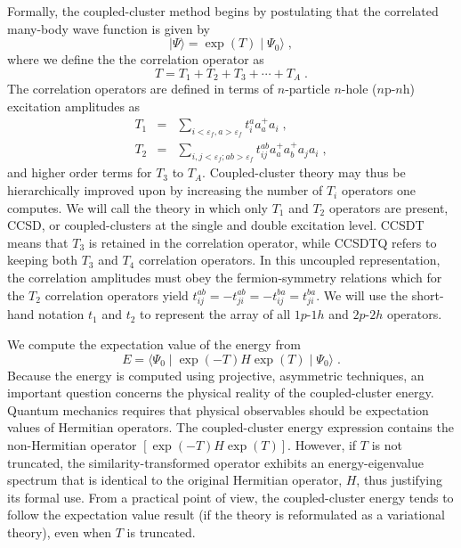 \documentclass[aps,prc,twocolumn,floatfix]{revtex4}
\begin{document}
Formally, the coupled-cluster method begins by postulating that 
the correlated many-body wave function is given by 
\begin{equation}
\mid \Psi \rangle = \exp\left(T\right)\mid \Psi_0\rangle  \;,
\end{equation}
where we define the 
the correlation operator as 
\begin{equation}
T=T_1 + T_2 + T_3 + \cdots + T_A \;. 
 \end{equation}
The correlation operators are defined in terms of 
$n$-particle $n$-hole ($n$p-$n$h) excitation amplitudes as 
\begin{eqnarray}
T_1 &=& \sum_{i<\varepsilon_f,a>\varepsilon_f} t^a_i a^+_a a_i\;, \\
T_2 &=& \sum_{i,j<\varepsilon_f; ab > \varepsilon_f}t^{ab}_{ij}
a^+_a a^+_b a_j a_i \;,
\end{eqnarray}
and higher order terms for $T_3$ to $T_A$. 
Coupled-cluster theory may thus be hierarchically  improved upon by 
increasing the number of $T_i$ operators one computes. We will call
the theory in which only $T_1$ and $T_2$ operators are present, CCSD, 
or coupled-clusters at the single and double excitation level. CCSDT 
means that $T_3$ is retained in the correlation operator, while CCSDTQ
refers to keeping both $T_3$ and $T_4$ correlation operators. 
In this uncoupled representation, the correlation amplitudes must 
obey the fermion-symmetry relations which for the 
$T_2$ correlation operators yield $t_{ij}^{ab} = - t_{ji}^{ab} 
= - t_{ij}^{ba} = t_{ji}^{ba}$.  We will use the short-hand notation 
$t_1$ and $t_2$ to represent the 
array of all $1p$-$1h$ and $2p$-$2h$ operators.

We compute the expectation value of the energy from 
\begin{equation}
E=\langle\Psi_0\mid \exp\left(-T\right) H \exp\left(T\right)
\mid\Psi_0\rangle\;. 
\end{equation}
Because the energy is computed using projective, asymmetric techniques,
an important question concerns the physical reality of the coupled-cluster
energy. Quantum mechanics requires that physical observables should be
expectation values of Hermitian operators. The coupled-cluster energy
expression contains the non-Hermitian operator $\left[\exp(-T)H\exp(T)\right]$. 
However, if $T$ is not truncated, the similarity-transformed operator
exhibits an energy-eigenvalue spectrum that is identical to the original
Hermitian operator, $H$, thus justifying its formal use. 
From a practical point of view, the coupled-cluster energy tends to
follow the expectation value result (if the theory is reformulated as 
a variational theory), even when $T$ is truncated. 
\end{document}
